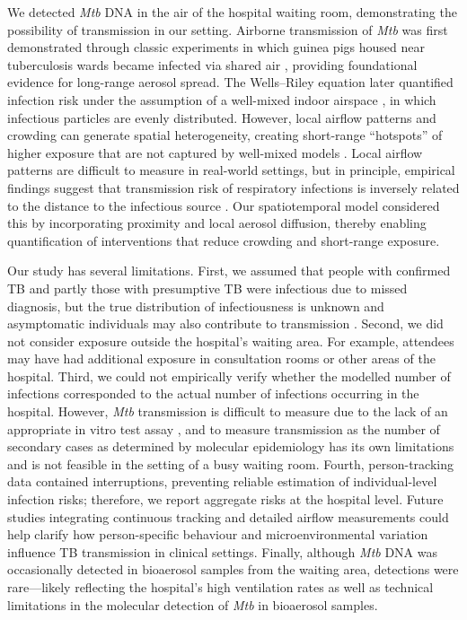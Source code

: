 \documentclass[11pt]{article}
\begin{document}
We detected \emph{Mtb} DNA in the air of the hospital waiting room, demonstrating the possibility of transmission in our setting. Airborne transmission of \emph{Mtb} was first demonstrated through classic experiments in which guinea pigs housed near tuberculosis wards became infected via shared air \cite{riley1959AmJEpidemiol}, providing foundational evidence for long-range aerosol spread. The Wells--Riley equation later quantified infection risk under the assumption of a well-mixed indoor airspace \cite{riley1978AmJEpidemiol}, in which infectious particles are evenly distributed. However, local airflow patterns and crowding can generate spatial heterogeneity, creating short-range ``hotspots'' of higher exposure that are not captured by well-mixed models \cite{ding2025BuildEnviron,poydenot2022PNASNexus}. Local airflow patterns are difficult to measure in real-world settings, but in principle, empirical findings suggest that transmission risk of respiratory infections is inversely related to the distance to the infectious source \cite{ko2004RiskAnal,kenyon1996NEnglJMed,hu2021ClinInfectDis}. Our spatiotemporal model considered this by incorporating proximity and local aerosol diffusion, thereby enabling quantification of interventions that reduce crowding and short-range exposure.

Our study has several limitations. First, we assumed that people with confirmed TB and partly those with presumptive TB were infectious due to missed diagnosis, but the true distribution of infectiousness is unknown and asymptomatic individuals may also contribute to transmission \cite{dheda2025Lancet}. Second, we did not consider exposure outside the hospital's waiting area. For example, attendees may have had additional exposure in consultation rooms or other areas of the hospital. Third, we could not empirically verify whether the modelled number of infections corresponded to the actual number of infections occurring in the hospital. However, \emph{Mtb} transmission is difficult to measure due to the lack of an appropriate in vitro test assay \cite{hill2010LancetInfectDis}, and to measure transmission as the number of secondary cases as determined by molecular epidemiology has its own limitations and is not feasible in the setting of a busy waiting room. Fourth, person-tracking data contained interruptions, preventing reliable estimation of individual-level infection risks; therefore, we report aggregate risks at the hospital level. Future studies integrating continuous tracking and detailed airflow measurements could help clarify how person-specific behaviour and microenvironmental variation influence TB transmission in clinical settings. Finally, although \emph{Mtb} DNA was occasionally detected in bioaerosol samples from the waiting area, detections were rare---likely reflecting the hospital's high ventilation rates as well as technical limitations in the molecular detection of \emph{Mtb} in bioaerosol samples.
\end{document}
